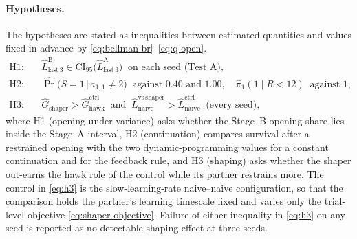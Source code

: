 \paragraph{Hypotheses.}
The hypotheses are stated as inequalities between estimated quantities
and values fixed in advance by \eqref{eq:bellman-br}--\eqref{eq:q-open}.
\begin{align}
  \text{H1:}\quad
  & \hat{L}^{\mathrm{B}}_{\mathrm{last\,3}} \in
    \mathrm{CI}_{95}\bigl(\hat{L}^{\mathrm{A}}_{\mathrm{last\,3}}\bigr)
    \ \text{ on each seed (Test~A)},
  \label{eq:h1} \\[3pt]
  \text{H2:}\quad
  & \widehat{\Pr}\bigl(S = 1 \,\big|\, a_{1,1} \ne 2\bigr)
    \ \text{ against } 0.40 \text{ and } 1.00, \quad
    \hat{\pi}_1(1 \mid R < 12) \ \text{ against } 1,
  \label{eq:h2} \\[3pt]
  \text{H3:}\quad
  & \hat{G}_{\mathrm{shaper}} > \hat{G}^{\mathrm{ctrl}}_{\mathrm{hawk}}
    \ \text{ and }\
    \hat{L}^{\mathrm{vs\,shaper}}_{\mathrm{naive}} > \hat{L}^{\mathrm{ctrl}}_{\mathrm{naive}}
    \ \text{ (every seed)},
  \label{eq:h3}
\end{align}
where H1 (opening under variance) asks whether the Stage~B opening share
lies inside the Stage~A interval, H2 (continuation) compares survival
after a restrained opening with the two dynamic-programming values for a
constant continuation and for the feedback rule, and H3 (shaping) asks
whether the shaper out-earns the hawk role of the control while its
partner restrains more.
The control in \eqref{eq:h3} is the slow-learning-rate naive--naive
configuration, so that the comparison holds the partner's learning
timescale fixed and varies only the trial-level objective
\eqref{eq:shaper-objective}.
Failure of either inequality in \eqref{eq:h3} on any seed is reported as
no detectable shaping effect at three seeds.
